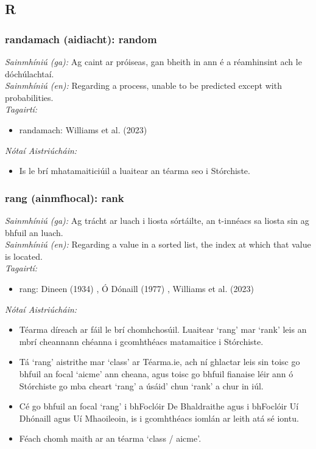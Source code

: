 \documentclass{article}
\begin{document}
\subsection*{R}

\subsubsection*{randamach (aidiacht): random}
 \noindent \textit{Sainmhíniú (ga):} Ag caint ar próiseas, gan bheith in ann é a réamhinsint ach le dóchúlachtaí.
\\
 \noindent \textit{Sainmhíniú (en):} Regarding a process, unable to be predicted except with probabilities.
\\
 \noindent \textit{Tagairtí:}
\begin{itemize}
	\item randamach: Williams et al. (2023) \cite{storchiste}
\end{itemize}

 \noindent \textit{Nótaí Aistriúcháin:}
\begin{itemize}
	\item Is le brí mhatamaiticiúil a luaitear an téarma seo i Stórchiste.
\end{itemize}


\subsubsection*{rang (ainmfhocal): rank}
 \noindent \textit{Sainmhíniú (ga):} Ag trácht ar luach i liosta sórtáilte, an t-innéacs sa liosta sin ag bhfuil an luach.
\\
 \noindent \textit{Sainmhíniú (en):} Regarding a value in a sorted list, the index at which that value is located.
\\
 \noindent \textit{Tagairtí:}
\begin{itemize}
	\item rang: Dineen (1934) \cite{dineen}, Ó Dónaill (1977) \cite{odonaill}, Williams et al. (2023) \cite{storchiste}
\end{itemize}

 \noindent \textit{Nótaí Aistriúcháin:}
\begin{itemize}
	\item Téarma díreach ar fáil le brí chomhchosúil. Luaitear `rang' mar `rank' leis an mbrí cheannann chéanna i gcomhthéacs matamaitice i Stórchiste.
	\item Tá `rang' aistrithe mar `class' ar Téarma.ie, ach ní ghlactar leis sin toisc go bhfuil an focal `aicme' ann cheana, agus toisc go bhfuil fianaise léir ann ó Stórchiste go mba cheart `rang' a úsáid' chun `rank' a chur in iúl.
	\item Cé go bhfuil an focal `rang' i bhFoclóir De Bhaldraithe agus i bhFoclóir Uí Dhónaill agus Uí Mhaoileoin, is i gcomhthéacs iomlán ar leith atá sé iontu.
	\item Féach chomh maith ar an téarma `class / aicme'.
\end{itemize}
\end{document}
